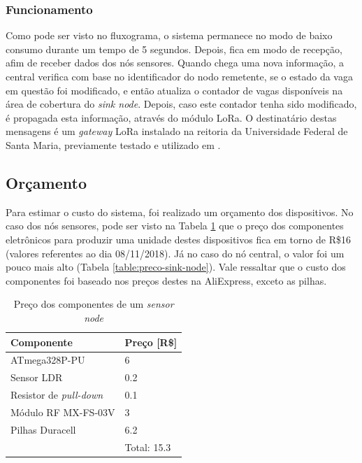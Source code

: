 \documentclass[oneside,openright,12pt]{ufsm_2015} %
\begin{document}
    \subsubsection{Funcionamento}
    Como pode ser visto no fluxograma, o sistema permanece no modo de baixo consumo durante um tempo de 5 segundos. Depois, fica em modo de recepção, afim de receber dados dos nós sensores. Quando chega uma nova informação, a central verifica com base no identificador do nodo remetente, se o estado da vaga em questão foi modificado, e então atualiza o contador de vagas disponíveis na área de cobertura do \textit{sink node}. Depois, caso este contador tenha sido modificado, é propagada esta informação, através do módulo LoRa. O destinatário destas mensagens é um \textit{gateway} LoRa instalado na reitoria da Universidade Federal de Santa Maria, previamente testado e utilizado em \cite{tcc:matheus-neis}. 
    
    \subsection{Orçamento}
    Para estimar o custo do sistema, foi realizado um orçamento dos dispositivos. No caso dos nós sensores, pode ser visto na Tabela \ref{table:preco-sensor-node} que o preço dos componentes eletrônicos para produzir uma unidade destes dispositivos fica em torno de R\$16 (valores referentes ao dia 08/11/2018). Já no caso do nó central, o valor foi um pouco mais alto (Tabela \ref{table:preco-sink-node}). Vale ressaltar que o custo dos componentes foi baseado nos preços destes na AliExpress, exceto as pilhas. 
    \begin{table}
   	    \caption{Preço dos componentes de um \textit{sensor node}}
	    \centering
	    \begin{tabular}{ l | l }
	    \hline
	    Componente & Preço [R\$]\\
	    \hline
	    ATmega328P-PU & 6 \\
	    \hline
	    Sensor LDR & 0.2\\
	    \hline
	    Resistor de \textit{pull-down} & 0.1\\
	    \hline
	    Módulo RF MX-FS-03V & 3\\
	    \hline
	    Pilhas Duracell & 6.2\\
	    \hline
	    & Total: 15.3
	    \end{tabular}
	    \vspace{\baselineskip} %
	    \label{table:preco-sensor-node}
\end{table}
    
\end{document}
